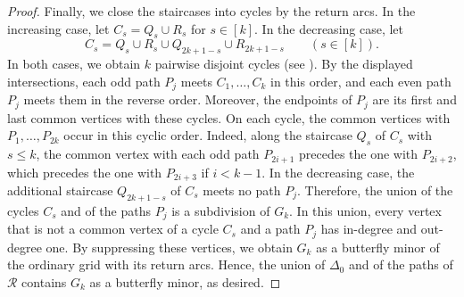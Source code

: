 \documentclass[fontsize=12pt,leading=14pt]{fullpaper}
\newcommand{\Rcal}{\mathcal{R}}
\begin{document}
\begin{proof}
  Finally, we close the staircases into cycles by the return arcs.
  In the increasing case, let $C_s=Q_s\cup R_s$ for $s\in[k]$.
  In the decreasing case, let
  \[
    C_s=Q_s\cup R_s\cup Q_{2k+1-s}\cup R_{2k+1-s}\qquad(s\in[k]).
  \]
  In both cases, we obtain $k$ pairwise disjoint cycles (see ).
  By the displayed intersections, each odd path $P_j$ meets $C_1,\dots,C_k$ in this order, and each even path $P_j$ meets them in the reverse order.
  Moreover, the endpoints of $P_j$ are its first and last common vertices with these cycles.
  On each cycle, the common vertices with $P_1,\dots,P_{2k}$ occur in this cyclic order.
  Indeed, along the staircase $Q_s$ of $C_s$ with $s\le k$, the common vertex with each odd path $P_{2i+1}$ precedes the one with $P_{2i+2}$, which precedes the one with $P_{2i+3}$ if $i<k-1$.
  In the decreasing case, the additional staircase $Q_{2k+1-s}$ of $C_s$ meets no path $P_j$.
  Therefore, the union of the cycles $C_s$ and of the paths $P_j$ is a subdivision of $G_k$.
  In this union, every vertex that is not a common vertex of a cycle $C_s$ and a path $P_j$ has in-degree and out-degree one.
  By suppressing these vertices, we obtain $G_k$ as a butterfly minor of the ordinary grid with its return arcs.
  Hence, the union of $\Delta_0$ and of the paths of $\Rcal$ contains $G_k$ as a butterfly minor, as desired.
\end{proof}
\end{document}
